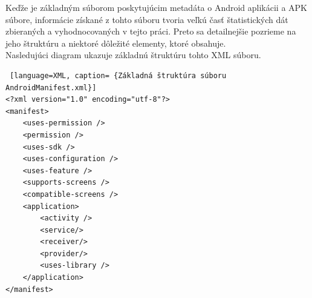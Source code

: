 Keďže  je základným súborom poskytujúcim metadáta o Android aplikácii a APK súbore, informácie získané z tohto súboru tvoria veľkú časť štatistických dát zbieraných a vyhodnocovaných v tejto práci. Preto sa detailnejšie pozrieme na jeho štruktúru a niektoré dôležité elementy, ktoré obsahuje.\\ Nasledujúci diagram ukazuje základnú štruktúru tohto XML súboru.
\begin{lstlisting} [language=XML, caption= {Základná štruktúra súboru AndroidManifest.xml}]
<?xml version="1.0" encoding="utf-8"?>
<manifest>
    <uses-permission />
    <permission />
    <uses-sdk />
    <uses-configuration />  
    <uses-feature />  
    <supports-screens />  
    <compatible-screens />  
    <application>
        <activity />
        <service/>
        <receiver/>
        <provider/>
        <uses-library />
    </application>
</manifest>
\end{lstlisting}

